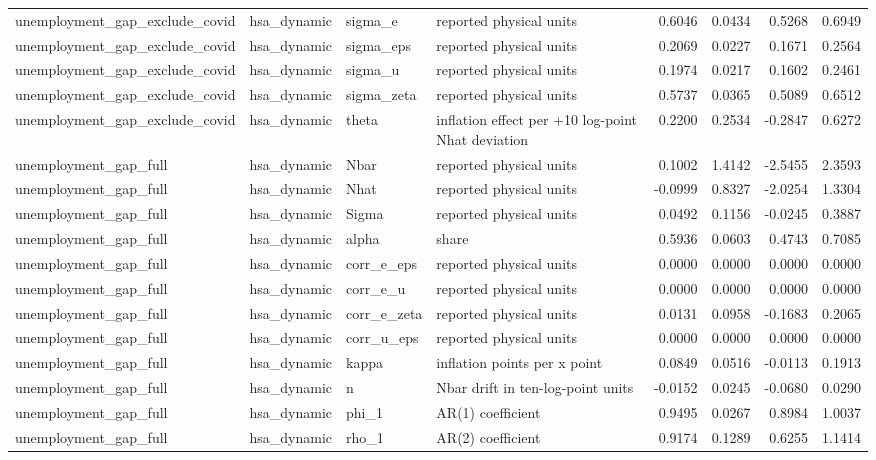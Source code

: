 \begin{tabular}{llllrrrr}
unemployment\_gap\_exclude\_covid & hsa\_dynamic & sigma\_e & reported physical units & 0.6046 & 0.0434 & 0.5268 & 0.6949 \\
unemployment\_gap\_exclude\_covid & hsa\_dynamic & sigma\_eps & reported physical units & 0.2069 & 0.0227 & 0.1671 & 0.2564 \\
unemployment\_gap\_exclude\_covid & hsa\_dynamic & sigma\_u & reported physical units & 0.1974 & 0.0217 & 0.1602 & 0.2461 \\
unemployment\_gap\_exclude\_covid & hsa\_dynamic & sigma\_zeta & reported physical units & 0.5737 & 0.0365 & 0.5089 & 0.6512 \\
unemployment\_gap\_exclude\_covid & hsa\_dynamic & theta & inflation effect per +10 log-point Nhat deviation & 0.2200 & 0.2534 & -0.2847 & 0.6272 \\
unemployment\_gap\_full & hsa\_dynamic & Nbar & reported physical units & 0.1002 & 1.4142 & -2.5455 & 2.3593 \\
unemployment\_gap\_full & hsa\_dynamic & Nhat & reported physical units & -0.0999 & 0.8327 & -2.0254 & 1.3304 \\
unemployment\_gap\_full & hsa\_dynamic & Sigma & reported physical units & 0.0492 & 0.1156 & -0.0245 & 0.3887 \\
unemployment\_gap\_full & hsa\_dynamic & alpha & share & 0.5936 & 0.0603 & 0.4743 & 0.7085 \\
unemployment\_gap\_full & hsa\_dynamic & corr\_e\_eps & reported physical units & 0.0000 & 0.0000 & 0.0000 & 0.0000 \\
unemployment\_gap\_full & hsa\_dynamic & corr\_e\_u & reported physical units & 0.0000 & 0.0000 & 0.0000 & 0.0000 \\
unemployment\_gap\_full & hsa\_dynamic & corr\_e\_zeta & reported physical units & 0.0131 & 0.0958 & -0.1683 & 0.2065 \\
unemployment\_gap\_full & hsa\_dynamic & corr\_u\_eps & reported physical units & 0.0000 & 0.0000 & 0.0000 & 0.0000 \\
unemployment\_gap\_full & hsa\_dynamic & kappa & inflation points per x point & 0.0849 & 0.0516 & -0.0113 & 0.1913 \\
unemployment\_gap\_full & hsa\_dynamic & n & Nbar drift in ten-log-point units & -0.0152 & 0.0245 & -0.0680 & 0.0290 \\
unemployment\_gap\_full & hsa\_dynamic & phi\_1 & AR(1) coefficient & 0.9495 & 0.0267 & 0.8984 & 1.0037 \\
unemployment\_gap\_full & hsa\_dynamic & rho\_1 & AR(2) coefficient & 0.9174 & 0.1289 & 0.6255 & 1.1414 \\

\end{tabular}
